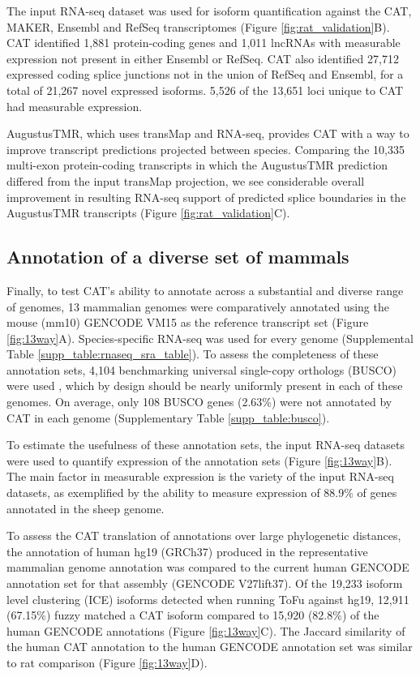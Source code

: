 \documentclass[fleqn,10pt]{wlscirep}
\begin{document}
The input RNA-seq dataset was used for isoform quantification against the CAT, MAKER, Ensembl and RefSeq transcriptomes (Figure \ref{fig:rat_validation}B). CAT identified 1,881 protein-coding genes and 1,011 lncRNAs with measurable expression not present in either Ensembl or RefSeq. CAT also identified 27,712 expressed coding splice junctions not in the union of RefSeq and Ensembl, for a total of 21,267 novel expressed isoforms. 5,526 of the 13,651 loci unique to CAT had measurable expression. 

AugustusTMR, which uses transMap and RNA-seq, provides CAT with a way to improve transcript predictions projected between species. Comparing the 10,335 multi-exon protein-coding transcripts in which the AugustusTMR prediction differed from the input transMap projection, we see considerable overall improvement in resulting RNA-seq support of predicted splice boundaries in the AugustusTMR transcripts (Figure \ref{fig:rat_validation}C). 

\subsection*{Annotation of a diverse set of mammals}

Finally, to test CAT's ability to annotate across a substantial and diverse range of genomes, 13 mammalian genomes were comparatively annotated using the mouse (mm10) GENCODE VM15 as the reference transcript set (Figure \ref{fig:13way}A). Species-specific RNA-seq was used for every genome (Supplemental Table \ref{supp_table:rnaseq_sra_table}). To assess the completeness of these annotation sets, 4,104 benchmarking universal single-copy orthologs (BUSCO) were used \cite{simao2015busco}, which by design should be nearly uniformly present in each of these genomes. On average, only 108 BUSCO genes (2.63\%) were not annotated by CAT in each genome (Supplementary Table \ref{supp_table:busco}). 

To estimate the usefulness of these annotation sets, the input RNA-seq datasets were used to quantify expression of the annotation sets (Figure \ref{fig:13way}B). The main factor in measurable expression is the variety of the input RNA-seq datasets, as exemplified by the ability to measure expression of 88.9\% of genes annotated in the sheep genome. 

To assess the CAT translation of annotations over large phylogenetic distances, the annotation of human hg19 (GRCh37) produced in the representative mammalian genome annotation was compared to the current human GENCODE annotation set for that assembly (GENCODE V27lift37). Of the 19,233 isoform level clustering (ICE) isoforms detected when running ToFu \cite{gordon2015widespread} against hg19, 12,911 (67.15\%) fuzzy matched a CAT isoform compared to 15,920 (82.8\%) of the human GENCODE annotations (Figure \ref{fig:13way}C). The Jaccard similarity of the human CAT annotation to the human GENCODE annotation set was similar to rat comparison (Figure \ref{fig:13way}D).
\end{document}
